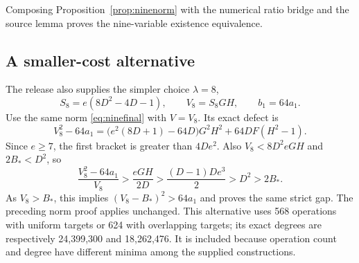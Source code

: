 Composing Proposition~\ref{prop:ninenorm} with the numerical ratio bridge
and the source lemma proves the nine-variable existence equivalence.

\subsection{A smaller-cost alternative}
The release also supplies the simpler choice $\lambda=8$,
\[
 S_8=e(8D^2-4D-1),\qquad V_8=S_8GH,\qquad b_1=64a_1.
\]
Use the same norm \eqref{eq:ninefinal} with $V=V_8$.
Its exact defect is
\[
 V_8^2-64a_1
 =\bigl(e^2(8D+1)-64D\bigr)G^2H^2+64DF(H^2-1).
\]
Since $e\ge7$, the first bracket is greater than $4De^2$.
Also $V_8<8D^2eGH$ and $2B_*<D^2$, so
\[
 \frac{V_8^2-64a_1}{V_8}
 >\frac{eGH}{2D}>\frac{(D-1)De^3}{2}>D^2>2B_*.
\]
As $V_8>B_*$, this implies $(V_8-B_*)^2>64a_1$ and proves the same
strict gap. The preceding norm proof applies unchanged.
This alternative uses 568 operations with uniform targets or 624 with
overlapping targets; its exact degrees are respectively 24,399,300 and
18,262,476. It is included because operation count and degree have
different minima among the supplied constructions.
